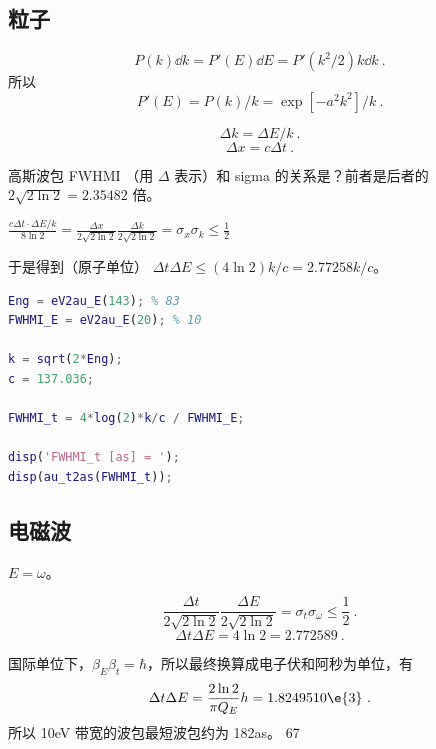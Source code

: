 
\subsection{粒子}
\begin{equation}
P(k)\dd{k} = P'(E)\dd{E} = P'(k^2/2)k\dd{k}~.
\end{equation}
所以
\begin{equation}
P'(E) = P(k)/k = \exp[-a^2 k^2]/k~.
\end{equation}

\begin{equation}
\Delta k = \Delta E/k~.
\end{equation}
\begin{equation}
\Delta x = c\Delta t~.
\end{equation}


高斯波包 FWHMI （用 $\Delta$ 表示）和 sigma 的关系是？前者是后者的 $2\sqrt{2\ln 2} = 2.35482$ 倍。

$\frac{c\Delta t \cdot \Delta E/k}{8\ln 2} = \frac{\Delta x}{2\sqrt{2\ln 2}}\frac{\Delta k}{2\sqrt{2\ln 2}} = \sigma_x \sigma_k \leq \frac{1}{2}$

于是得到（原子单位） $\Delta t\Delta E \leq (4\ln 2)k/c = 2.77258 k/c$。

\begin{lstlisting}[language=matlab]
Eng = eV2au_E(143); % 83
FWHMI_E = eV2au_E(20); % 10

k = sqrt(2*Eng);
c = 137.036;

FWHMI_t = 4*log(2)*k/c / FWHMI_E;

disp('FWHMI_t [as] = ');
disp(au_t2as(FWHMI_t));
\end{lstlisting}

\subsection{电磁波}
$E = \omega$。

\begin{equation}
\frac{\Delta t}{2\sqrt{2\ln 2}}\frac{\Delta E}{2\sqrt{2\ln 2}} = \sigma_t \sigma_\omega \leq \frac{1}{2}~.
\end{equation}
\begin{equation}
\Delta t\Delta E = 4\ln 2 = 2.772589~.
\end{equation}

国际单位下，$\beta_E\beta_t = \hbar$，所以最终换算成电子伏和阿秒为单位，有
\begin{equation}
\Delta t \Delta E  = \frac{2\ln 2}{\pi Q_E}h = 1.8249510\e{3}~.
\end{equation}
所以 10eV 带宽的波包最短波包约为 182as。
67